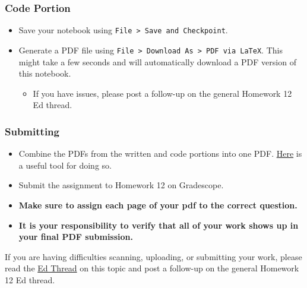\documentclass[11pt]{article}
\providecommand{\tightlist}{%
      \setlength{\itemsep}{0pt}\setlength{\parskip}{0pt}}
\begin{document}
\hypertarget{code-portion}{%
\subsubsection{Code Portion}\label{code-portion}}

\begin{itemize}
\tightlist
\item
  Save your notebook using
  \texttt{File\ \textgreater{}\ Save\ and\ Checkpoint}.
\item
  Generate a PDF file using
  \texttt{File\ \textgreater{}\ Download\ As\ \textgreater{}\ PDF\ via\ LaTeX}.
  This might take a few seconds and will automatically download a PDF
  version of this notebook.

  \begin{itemize}
  \tightlist
  \item
    If you have issues, please post a follow-up on the general Homework
    12 Ed thread.
  \end{itemize}
\end{itemize}

\hypertarget{submitting}{%
\subsubsection{Submitting}\label{submitting}}

\begin{itemize}
\tightlist
\item
  Combine the PDFs from the written and code portions into one PDF.
  \href{https://smallpdf.com/merge-pdf}{Here} is a useful tool for doing
  so.
\item
  Submit the assignment to Homework 12 on Gradescope.
\item
  \textbf{Make sure to assign each page of your pdf to the correct
  question.}
\item
  \textbf{It is your responsibility to verify that all of your work
  shows up in your final PDF submission.}
\end{itemize}

If you are having difficulties scanning, uploading, or submitting your
work, please read the
\href{https://edstem.org/us/courses/94054/discussion/7533569}{Ed Thread}
on this topic and post a follow-up on the general Homework 12 Ed thread.


    
    
    
\end{document}

